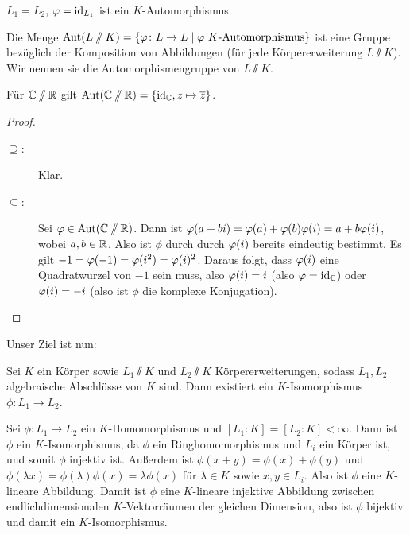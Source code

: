\documentclass[12pt,a4paper]{scrartcl}
\begin{document}
\begin{bsp}
	$L_1 = L_2$, $\varphi = \operatorname{id}_{L_1}$ ist ein $K$-Automorphismus.
\end{bsp}

\begin{defi}
	Die Menge $\operatorname{Aut}(L\sslash K) = \{\varphi\colon L\to L\mid \varphi\ K\text{-Automorphismus}\}$ ist eine Gruppe bezüglich der Komposition von Abbildungen (für jede Körpererweiterung $L\sslash K$). Wir nennen sie die Automorphismengruppe von $L\sslash K$.
\end{defi}

\begin{bsp}
	Für $\mathbb C\sslash \mathbb R$ gilt $\operatorname{Aut}(\mathbb C\sslash\mathbb R) =\{\operatorname{id}_\mathbb C, z\mapsto \overline{z}\}$.
\end{bsp}
\begin{proof}
	\leavevmode
	\begin{description}
		\item[\glqq$\supseteq$\grqq:] Klar.
		\item[\glqq$\subseteq$\grqq:] Sei $\varphi\in \operatorname{Aut}(\mathbb C\sslash\mathbb R)$. Dann ist $\varphi(a+bi) =\varphi(a)+\varphi(b)\varphi(i) = a+b\varphi(i)$, wobei $a,b\in\mathbb R$. Also ist $\phi$ durch durch $\varphi(i)$ bereits eindeutig bestimmt. Es gilt $-1 = \varphi(-1) = \varphi(i^2) = \varphi(i)^2$. Daraus folgt, dass $\varphi(i)$ eine Quadratwurzel von $-1$ sein muss, also $\varphi(i)=i$ (also $\varphi = \operatorname{id}_\mathbb C$) oder $\varphi(i) = -i$ (also ist $\phi$ die komplexe Konjugation).
	\end{description}
\end{proof}

\noindent
Unser Ziel ist nun:
\begin{satz}\label{thm:16.3}
	Sei $K$ ein Körper sowie $L_1\sslash K$ und $L_2\sslash K$ Körpererweiterungen, sodass $L_1,L_2$ algebraische Abschlüsse von $K$ sind. Dann existiert ein $K$-Isomorphismus $\phi\colon L_1\to L_2$.
\end{satz}

\begin{bem}
	Sei $\phi\colon L_1\to L_2$ ein $K$-Homomorphismus und $[L_1:K] = [L_2:K]<\infty$. Dann ist $\phi$ ein $K$-Isomorphismus, da $\phi$ ein Ringhomomorphismus und $L_i$ ein Körper ist, und somit $\phi$ injektiv ist. Außerdem ist $\phi(x+y) = \phi(x)+\phi(y)$ und $\phi(\lambda x) = \phi(\lambda)\phi(x) = \lambda\phi(x)$ für $\lambda\in K$ sowie $x,y\in L_i$. Also ist $\phi$ eine $K$-lineare Abbildung. Damit ist $\phi$ eine $K$-lineare injektive Abbildung zwischen endlichdimensionalen $K$-Vektorräumen der gleichen Dimension, also ist $\phi$ bijektiv und damit ein $K$-Isomorphismus.
\end{bem}
\end{document}
